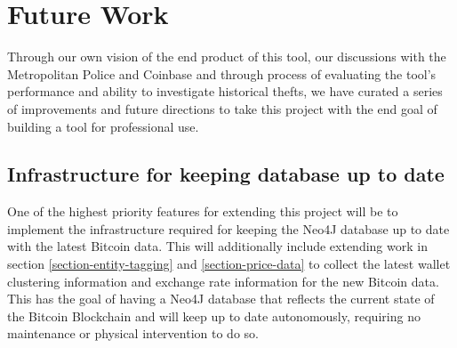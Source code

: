 \section{Future Work}
Through our own vision of the end product of this tool, our discussions with the Metropolitan Police and Coinbase and through process of evaluating the tool's performance and ability to investigate historical thefts, we have curated a series of improvements and future directions to take this project with the end goal of building a tool for professional use. 

\subsection{Infrastructure for keeping database up to date}\label{future-work:keep-up}
One of the highest priority features for extending this project will be to implement the infrastructure required for keeping the Neo4J database up to date with the latest Bitcoin data. This will additionally include extending work in section \ref{section-entity-tagging} and \ref{section-price-data} to collect the latest wallet clustering information and exchange rate information for the new Bitcoin data. This has the goal of having a Neo4J database that reflects the current state of the Bitcoin Blockchain and will keep up to date autonomously, requiring no maintenance or physical intervention to do so. 


